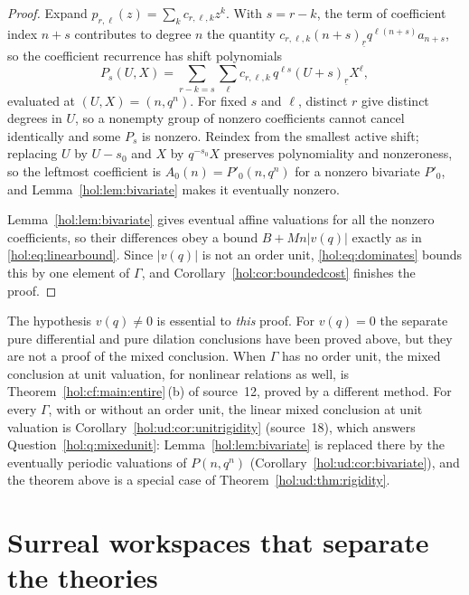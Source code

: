 \documentclass[11pt]{article}
\numberwithin{equation}{section}
\theoremstyle{definition}
\theoremstyle{remark}
\newcommand{\fall}[2]{(#1)_{\underline{#2}}}
\newcommand{\abs}[1]{\lvert#1\rvert}
\begin{document}
\begin{proof}
Expand $p_{r,\ell}(z)=\sum_kc_{r,\ell,k}z^k$. With $s=r-k$, the term of
coefficient index $n+s$ contributes to degree $n$ the quantity
$c_{r,\ell,k}\fall{n+s}{r}q^{\ell(n+s)}a_{n+s}$, so the coefficient recurrence
has shift polynomials
\begin{equation}\label{hol:eq:mixedshift}
 P_s(U,X)=\sum_{r-k=s}\sum_\ell c_{r,\ell,k}\,q^{\ell s}\fall{U+s}{r}X^\ell,
\end{equation}
evaluated at $(U,X)=(n,q^n)$. For fixed $s$ and $\ell$, distinct $r$ give
distinct degrees in $U$, so a nonempty group of nonzero coefficients cannot
cancel identically and some $P_s$ is nonzero. Reindex from the smallest active
shift; replacing $U$ by $U-s_0$ and $X$ by $q^{-s_0}X$ preserves polynomiality
and nonzeroness, so the leftmost coefficient is $A_0(n)=P'_0(n,q^n)$ for a
nonzero bivariate $P'_0$, and Lemma~\ref{hol:lem:bivariate} makes it
eventually nonzero.

Lemma~\ref{hol:lem:bivariate} gives eventual affine valuations for all the
nonzero coefficients, so their differences obey a bound $B+Mn\abs{v(q)}$
exactly as in \eqref{hol:eq:linearbound}. Since $\abs{v(q)}$ is not an order
unit, \eqref{hol:eq:dominates} bounds this by one element of $\Gamma$, and
Corollary~\ref{hol:cor:boundedcost} finishes the proof.
\end{proof}

The hypothesis $v(q)\ne0$ is essential to \emph{this} proof. For $v(q)=0$ the
separate pure differential and pure dilation conclusions have been proved
above, but they are not a proof of the mixed conclusion. When $\Gamma$ has no
order unit, the mixed conclusion at unit valuation, for nonlinear relations
as well, is Theorem~\ref{hol:cf:main:entire}\,(b) of source~12, proved by a
different method. For every $\Gamma$, with or without an order unit, the
linear mixed conclusion at unit valuation is
Corollary~\ref{hol:ud:cor:unitrigidity} (source~18), which answers
Question~\ref{hol:q:mixedunit}: Lemma~\ref{hol:lem:bivariate} is replaced there
by the eventually periodic valuations of $P(n,q^n)$
(Corollary~\ref{hol:ud:cor:bivariate}), and the theorem above is a special
case of Theorem~\ref{hol:ud:thm:rigidity}.

\section{Surreal workspaces that separate the theories}
\label{hol:sec:surreal}
\end{document}
